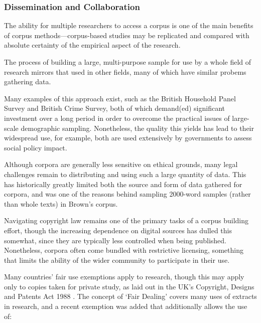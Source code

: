 






\subsubsection{Dissemination and Collaboration}
The ability for multiple researchers to access a corpus is one of the main benefits of corpus methods---corpus-based studies may be replicated and compared with absolute certainty of the empirical aspect of the research.

The process of building a large, multi-purpose sample for use by a whole field of research mirrors that used in other fields, many of which have similar probems gathering data.

Many examples of this approach exist, such as the British Household Panel Survey and British Crime Survey\cite{taylor1996british,hough1983british}, both of which demand(ed) significant investment over a long period in order to overcome the practical issues of large-scale demographic sampling.  Nonetheless, the quality this yields has lead to their widespread use, for example, both are used extensively by governments to assess social policy impact.

Although corpora are generally less sensitive on ethical grounds, many legal challenges remain to distributing and using such a large quantity of data.  This has historically greatly limited both the source and form of data gathered for corpora, and was one of the reasons behind sampling 2000-word samples (rather than whole texts) in Brown's corpus.

Navigating copyright law remains one of the primary tasks of a corpus building effort, though the increasing dependence on digital sources has dulled this somewhat, since they are typically less controlled when being published.  Nonetheless, corpora often come bundled with restrictive licensing, something that limits the ability of the wider community to participate in their use.

Many countries' fair use exemptions apply to research, though this may apply only to copies taken for private study, as laid out in the UK's Copyright, Designs and Patents Act 1988
.  The concept of `Fair Dealing' covers many uses of extracts in research, and a recent exemption was added that additionally allows the use of\cite{intellectualpropertyofficeuk2014}:

